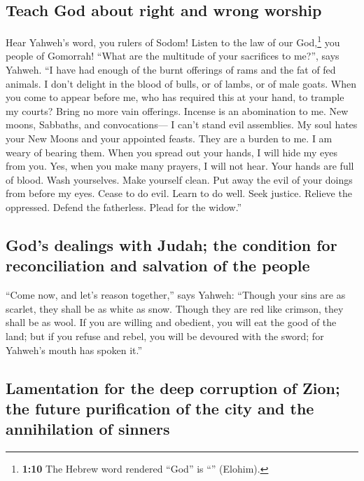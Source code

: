 \hypertarget{teach-god-about-right-and-wrong-worship}{%
\subsection{Teach God about right and wrong
worship}\label{teach-god-about-right-and-wrong-worship}}

 Hear Yahweh's word, you rulers of Sodom! Listen to the
law of our God,\footnote{\textbf{1:10} The Hebrew word rendered ``God''
  is ``'' (Elohim).} you people of Gomorrah!
 ``What are the multitude of your sacrifices to me?'',
says Yahweh. ``I have had enough of the burnt offerings of rams and the
fat of fed animals. I don't delight in the blood of bulls, or of lambs,
or of male goats.  When you come to appear before me, who
has required this at your hand, to trample my courts? 
Bring no more vain offerings. Incense is an abomination to me. New
moons, Sabbaths, and convocations--- I can't stand evil assemblies.
 My soul hates your New Moons and your appointed feasts.
They are a burden to me. I am weary of bearing them. 
When you spread out your hands, I will hide my eyes from you. Yes, when
you make many prayers, I will not hear. Your hands are full of blood.
 Wash yourselves. Make yourself clean. Put away the evil
of your doings from before my eyes. Cease to do evil. 
Learn to do well. Seek justice. Relieve the oppressed. Defend the
fatherless. Plead for the widow.''

\hypertarget{gods-dealings-with-judah-the-condition-for-reconciliation-and-salvation-of-the-people}{%
\subsection{God's dealings with Judah; the condition for reconciliation
and salvation of the
people}\label{gods-dealings-with-judah-the-condition-for-reconciliation-and-salvation-of-the-people}}

 ``Come now, and let's reason together,'' says Yahweh:
``Though your sins are as scarlet, they shall be as white as snow.
Though they are red like crimson, they shall be as wool. 
If you are willing and obedient, you will eat the good of the land;
 but if you refuse and rebel, you will be devoured with
the sword; for Yahweh's mouth has spoken it.''

\hypertarget{lamentation-for-the-deep-corruption-of-zion-the-future-purification-of-the-city-and-the-annihilation-of-sinners}{%
\subsection{Lamentation for the deep corruption of Zion; the future
purification of the city and the annihilation of
sinners}\label{lamentation-for-the-deep-corruption-of-zion-the-future-purification-of-the-city-and-the-annihilation-of-sinners}}

